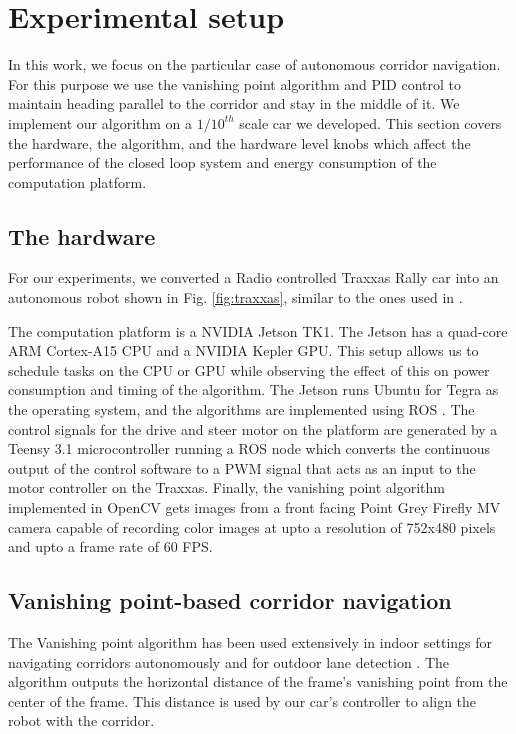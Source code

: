\section{Experimental setup}

In this work, we focus on the particular case of autonomous corridor navigation. 
For this purpose we use the vanishing point algorithm and PID control to maintain heading parallel to the corridor and stay in the middle of it. We implement our algorithm on a $1/10^{th}$ scale car we developed. This section covers the hardware, the algorithm, and the hardware level knobs which affect the performance of the closed loop system and energy consumption of the computation platform.

\subsection{The hardware}

For our experiments, we converted a Radio controlled Traxxas Rally car into an autonomous robot shown in Fig. \ref{fig:traxxas}, similar to the ones used in \cite{racecar_mit}.

The computation platform is a NVIDIA Jetson TK1. 
The Jetson has a quad-core ARM Cortex-A15 CPU and a NVIDIA Kepler GPU. 
This setup allows us to schedule tasks on the CPU or GPU while observing the effect of this on power consumption and timing of the algorithm. 
The Jetson runs Ubuntu for Tegra as the operating system, and the algorithms are implemented using ROS \cite{ros}. The control signals for the drive and steer motor on the platform are generated by a Teensy 3.1 microcontroller running a ROS node which converts the continuous output of the control software to a PWM signal that acts as an input to the motor controller on the Traxxas. 
Finally, the vanishing point algorithm implemented in OpenCV \cite{opencv} gets images from a front facing Point Grey Firefly MV camera capable of recording color images at upto a resolution of 752x480 pixels and upto a frame rate of 60 FPS. 

\subsection{Vanishing point-based corridor navigation}

The Vanishing point algorithm \cite{VP1} has been used extensively in indoor settings for navigating corridors autonomously \cite{VP2, VP3} and for outdoor lane detection \cite{gallagher2002ground}. 
The algorithm outputs the horizontal distance of the frame's vanishing point from the center of the frame. 
This distance is used by our car's controller to align the robot with the corridor. 

